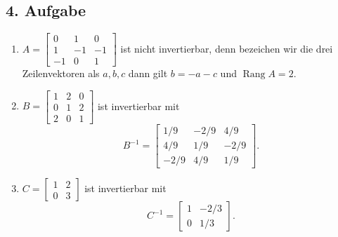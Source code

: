 \documentclass[fleqn,draft,a5paper]{article}
\theoremstyle{remark}
\DeclareMathOperator{\Rang}{Rang}
\begin{document}
\subsection{4. Aufgabe}
\begin{enumerate}
\item \(A =
  \left[
  \begin{smallmatrix}
    0 & 1 & 0 \\ 1 & -1 & -1 \\ -1 & 0 & 1
  \end{smallmatrix}\right]
  \) ist nicht invertierbar, denn bezeichen wir die drei Zeilenvektoren
  als \(a, b , c\) dann gilt \(b=-a-c\) und \(\Rang A = 2\).
\item \(B =
  \left[
  \begin{smallmatrix}
    1 & 2 & 0 \\ 0 & 1 & 2 \\ 2 & 0 & 1
  \end{smallmatrix}\right]
  \)
  ist invertierbar mit
  \[
    B^{-1} =
    \begin{bmatrix}
      1/9 & -2/9 & 4/9 \\ 4/9 & 1/9 & -2/9 \\ -2/9 & 4/9 & 1/9
    \end{bmatrix}.
  \]
\item \(C=
  \begin{bmatrix}
    1 & 2 \\ 0 & 3
  \end{bmatrix}
  \)
  ist invertierbar mit
  \[C^{-1}=
    \begin{bmatrix}
      1 & -2/3 \\ 0 & 1/3
    \end{bmatrix}.
  \]
\end{enumerate}
\end{document}
